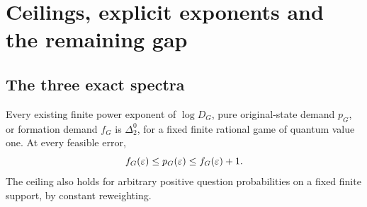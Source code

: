 \section{Ceilings, explicit exponents and the remaining gap}\label{sec:power-ceilings}
\subsection{The three exact spectra}
\begin{proposition}\label{prop:power-ceilings}
Every existing finite power exponent of $\log D_G$, pure original-state demand $p_G$, or formation demand $f_G$ is $\Delta^0_2$, for a fixed finite rational game of quantum value one. At every feasible error,
\[
 f_G(\varepsilon)\le p_G(\varepsilon)\le f_G(\varepsilon)+1.
\]
The ceiling also holds for arbitrary positive question probabilities on a fixed finite support, by constant reweighting.
\end{proposition}
